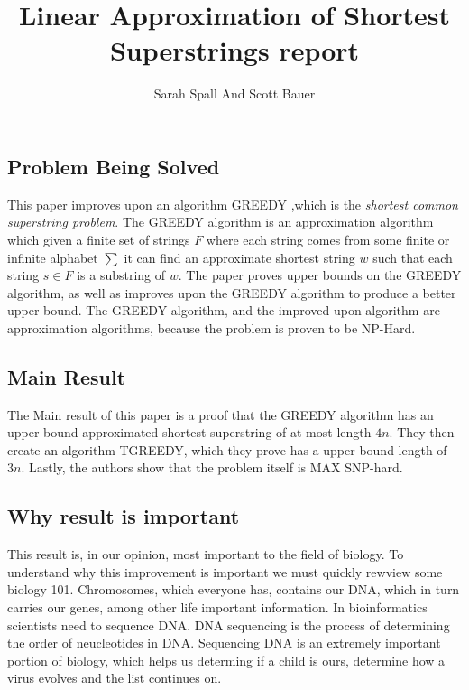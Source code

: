 \documentclass[letterpaper,twocolumn,11pt]{article}
\title{Linear Approximation of Shortest Superstrings report}
\author[1]{Sarah Spall And Scott Bauer}
\begin{document}
\maketitle

\subsection*{Problem Being Solved}

This paper improves upon an algorithm GREEDY \cite{tarhio1988greedy},which is the \textit{shortest common superstring problem}. The GREEDY algorithm is an approximation algorithm which given a finite set of strings $F$ where each string comes from some finite or infinite alphabet $\sum$ it can find an approximate shortest string $w$ such that each string $s \in F$ is a substring of $w$. The paper proves upper bounds on the GREEDY algorithm, as well as improves upon the GREEDY algorithm to produce a better upper bound. The GREEDY algorithm, and the improved upon algorithm are approximation algorithms, because the problem is proven to be NP-Hard. \cite{gallant1980finding}
 


\subsection*{Main Result}

The Main result of this paper is a proof that the GREEDY algorithm has an upper bound approximated shortest superstring of at most length $4n$. They then create an algorithm TGREEDY, which they prove has a upper bound length of $3n$. Lastly, the authors show that the problem itself is MAX SNP-hard.

\subsection*{Why result is important}

This result is, in our opinion, most important to the field of biology. To understand why this improvement is important we must quickly rewview some biology 101. Chromosomes, which everyone has, contains our DNA, which in turn carries our genes, among other life important information. In bioinformatics scientists need to sequence DNA. DNA sequencing is the process of determining the order of neucleotides in DNA. Sequencing DNA is an extremely important portion of biology, which helps us determing if a child is ours, determine how a virus evolves and the list continues on. 
\end{document}
